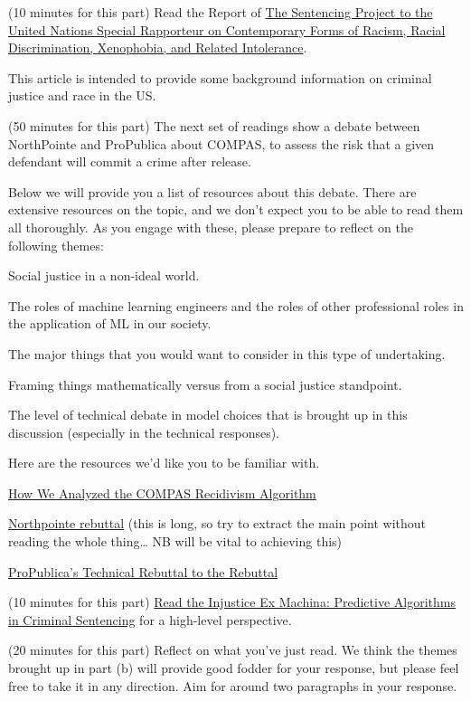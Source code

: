 \documentclass[assignment02_Solutions]{subfiles}
\begin{document}
\begin{exercise}
\bes
\item (10 minutes for this part) Read the Report of \href{http://nb.mit.edu/f/56086}{The Sentencing Project to the United Nations Special Rapporteur on Contemporary Forms of Racism, Racial Discrimination, Xenophobia, and Related Intolerance}. 

This article is intended to provide some background information on criminal justice and race in the US. 

\item (50 minutes for this part) The next set of readings show a debate between NorthPointe and ProPublica about COMPAS,  to assess the risk that a given defendant will commit a crime after release. 

Below we will provide you a list of resources about this debate. There are extensive resources on the topic, and we don’t expect you to be able to read them all thoroughly.  As you engage with these, please prepare to reflect on the following themes:
\bi
\item Social justice in a non-ideal world.
\item The roles of machine learning engineers and the roles of other professional roles in the application of ML in our society.
\item The major things that you would want to consider in this type of undertaking.
\item Framing things mathematically versus from a social justice standpoint.
\item The level of technical debate in model choices that is brought up in this discussion (especially in the technical responses). 
\ei

Here are the resources we'd like you to be familiar with.
\bi
\item \href{http://nb.mit.edu/f/56084}{How We Analyzed the COMPAS Recidivism Algorithm}
\item \href{http://nb.mit.edu/f/56087}{Northpointe rebuttal} (this is long, so try to extract the main point without reading the whole thing… NB will be vital to achieving this)
\item \href{http://nb.mit.edu/f/56088}{ProPublica's Technical Rebuttal to the Rebuttal}
\ei

\item (10 minutes for this part) \href{http://nb.mit.edu/f/56089}{Read the Injustice Ex Machina: Predictive Algorithms in Criminal Sentencing} for a high-level perspective.
\item (20 minutes for this part) Reflect on what you've just read.  We think the themes brought up in part (b) will provide good fodder for your response, but please feel free to take it in any direction.  Aim for around two paragraphs in your response.
\ees

\end{exercise}
\end{document}
